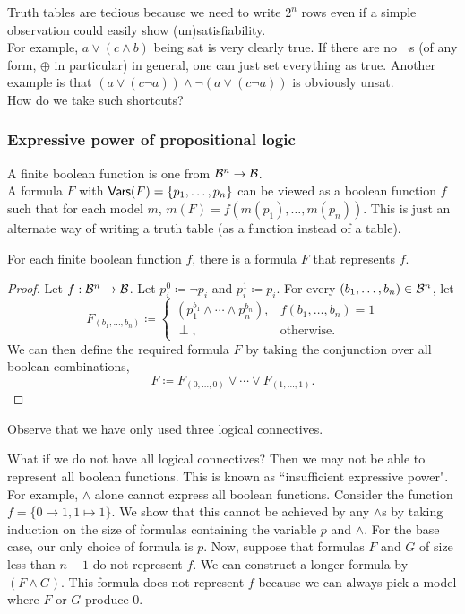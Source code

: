 Truth tables are tedious because we need to write $2^n$ rows even if a simple observation could easily show (un)satisfiability.\\
For example, $a \vee (c \wedge b)$ being sat is very clearly true. If there are no $\neg$s (of any form, $\oplus$ in particular) in general, one can just set everything as true. Another example is that $(a \vee (c \neg a))\wedge\neg (a \vee (c \neg a))$ is obviously unsat.\\
How do we take such shortcuts?

\subsubsection{Expressive power of propositional logic}

A finite boolean function is one from $\mathcal{B}^n\to\mathcal{B}$.\\
A formula $F$ with $\mathsf{Vars}(F)=\{p_1,\ldots,p_n\}$ can be viewed as a boolean function $f$ such that for each model $m$, $m(F)=f(m(p_1),\ldots,m(p_n))$. This is just an alternate way of writing a truth table (as a function instead of a table).

\begin{theorem}
For each finite boolean function $f$, there is a formula $F$ that represents $f$.
\end{theorem}
\begin{proof}
Let $f:\mathcal{B}^n\to\mathcal{B}$. Let $p_i^0\coloneqq\neg p_i$ and $p_i^1\coloneqq p_i$. For every $(b_1,\ldots,b_n)\in\mathcal{B}^n$, let
\[
	F_{(b_1,\ldots,b_n)} \coloneqq
	\begin{cases}
		(p_1^{b_1}\wedge\cdots\wedge p_n^{b_n}), & f(b_1,\ldots,b_n)=1 \\
		\perp, & \text{otherwise.}
	\end{cases}
\]
We can then define the required formula $F$ by taking the conjunction over all boolean combinations,
\[ F \coloneqq F_{(0,\ldots,0)} \vee \cdots \vee F_{(1,\ldots,1)}. \]
\end{proof}

Observe that we have only used three logical connectives.

What if we do not have all logical connectives? Then we may not be able to represent all boolean functions. This is known as ``insufficient expressive power".\\

For example, $\wedge$ alone cannot express all boolean functions. Consider the function $f=\{0\mapsto 1, 1\mapsto 1\}$. We show that this cannot be achieved by any $\wedge$s by taking induction on the size of formulas containing the variable $p$ and $\wedge$. For the base case, our only choice of formula is $p$. Now, suppose that formulas $F$ and $G$ of size less than $n-1$ do not represent $f$. We can construct a longer formula by $(F\wedge G)$. This formula does not represent $f$ because we can always pick a model where $F$ or $G$ produce $0$.

